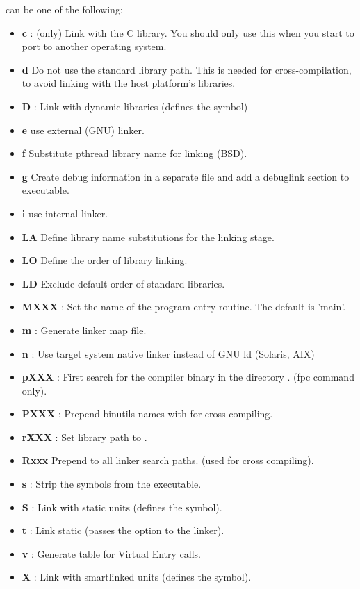 \begin{description}
can be one of the following:
\begin{itemize}
\item \textbf{c} : (\linux only) Link with the C library. You should only use this when
  you start to port \fpc to another operating system. 
\item \textbf{d} Do not use the standard library path. This is needed for
cross-compilation, to avoid linking with the host platform's libraries.
\item \textbf{D} : Link with dynamic libraries (defines the
 symbol) 
\item \textbf{e} use external (GNU) linker.
\item \textbf{f}  Substitute pthread library name for linking (BSD).
\item \textbf{g} Create debug information in a separate file and add a debuglink section to executable.
\item \textbf{i} use internal linker.
\item \textbf{LA}  Define library name substitutions for the linking stage.
\item \textbf{LO}  Define the order of library linking.
\item \textbf{LD}  Exclude default order of standard libraries.
 \item \textbf{MXXX} : Set the name of the program entry routine.
The default is 'main'.
\item \textbf{m} : Generate linker map file.
\item \textbf{n} : Use target system native linker instead of GNU ld (Solaris, AIX)
\item \textbf{pXXX} :   First search for the compiler binary in the directory .  (fpc command only).
\item \textbf{PXXX} : Prepend binutils names with   for cross-compiling.
\item \textbf{rXXX} : Set library path to .
\item \textbf{Rxxx} Prepend  to all linker search paths. (used for
cross compiling).
\item \textbf{s} : Strip the symbols from the executable. 
\item \textbf{S} : Link with static units (defines the  symbol).
\item \textbf{t} : Link static (passes the  option to the linker). 
\item \textbf{v} : Generate table for Virtual Entry calls.
\item \textbf{X} : Link with smartlinked units (defines the  symbol). 
\end{itemize}
\end{description}

